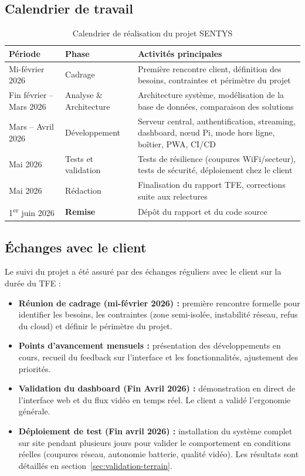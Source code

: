 \documentclass[12pt,a4paper]{article}
\begin{document}
\subsection{Calendrier de travail}

\begin{table}[H]
\centering
\small
\renewcommand{\arraystretch}{1.3}
\begin{tabular}{|l|l|p{7cm}|}
\hline
\textbf{Période} & \textbf{Phase} & \textbf{Activités principales} \\
\hline
Mi-février 2026 & Cadrage & Première rencontre client, définition des besoins, contraintes et périmètre du projet \\
\hline
Fin février -- Mars 2026 & Analyse \& Architecture & Architecture système, modélisation de la base de données, comparaison des solutions \\
\hline
Mars -- Avril 2026 & Développement & Serveur central, authentification, streaming, dashboard, nœud Pi, mode hors ligne, boîtier, PWA, CI/CD \\
\hline
Mai 2026 & Tests et validation & Tests de résilience (coupures WiFi/secteur), tests de sécurité, déploiement chez le client \\
\hline
Mai 2026 & Rédaction & Finalisation du rapport TFE, corrections suite aux relectures \\
\hline
1\textsuperscript{er} juin 2026 & \textbf{Remise} & Dépôt du rapport et du code source \\
\hline
\end{tabular}
\caption{Calendrier de réalisation du projet SENTYS}
\end{table}

\subsection{Échanges avec le client}

Le suivi du projet a été assuré par des échanges réguliers avec le client sur la durée du TFE :

\begin{itemize}[label=\textbullet]
    \item \textbf{Réunion de cadrage (mi-février 2026) :} première rencontre formelle pour identifier les besoins, les contraintes (zone semi-isolée, instabilité réseau, refus du cloud) et définir le périmètre du projet.
    \item \textbf{Points d'avancement mensuels :} présentation des développements en cours, recueil du feedback sur l'interface et les fonctionnalités, ajustement des priorités.
    \item \textbf{Validation du dashboard (Fin Avril 2026) :} démonstration en direct de l'interface web et du flux vidéo en temps réel. Le client a validé l'ergonomie générale.
    \item \textbf{Déploiement de test (Fin avril 2026) :} installation du système complet sur site pendant plusieurs jours pour valider le comportement en conditions réelles (coupures réseau, autonomie batterie, qualité vidéo). Les résultats sont détaillés en section~\ref{sec:validation-terrain}.
\end{itemize}
\end{document}
